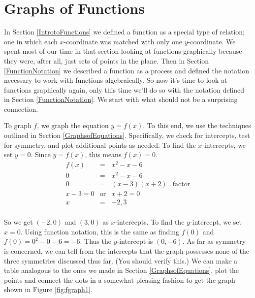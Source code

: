 \section{Graphs of Functions}
\label{GraphsofFunctions}

In Section \ref{IntrotoFunctions} we defined a function as a special type of relation; one in which each $x$-coordinate was matched with only one $y$-coordinate.  We spent most of our time in that section looking at functions graphically because they were, after all, just sets of points in the plane. Then in Section \ref{FunctionNotation} we described a function as a process and defined the notation necessary to work with functions algebraically.  So now it's time to look at functions graphically again, only this time we'll do so with the notation defined in Section \ref{FunctionNotation}.  We start with what should not be a surprising connection.

\smallskip


\medskip

{
To graph $f$, we graph the equation $y = f(x)$.  To this end, we use the techniques outlined in Section \ref{GraphsofEquations}.  Specifically, we check for intercepts, test for symmetry, and plot additional points as needed.  To find the $x$-intercepts, we set $y=0$. Since $y = f(x)$, this means $f(x) = 0$. 
\[
\begin{array}{rclr}   
f(x) & = & x^2 - x - 6 & \\ 
0 & = & x^2 - x - 6 & \\ 
0 & = & (x-3)(x+2) & \mbox{factor} \\ 
x-3 = 0 & \mbox{or} & x+2 = 0 & \\
x & = & -2, 3 & \\
\end{array} 
\]

So we get $(-2,0)$ and $(3,0)$ as $x$-intercepts.  To find the $y$-intercept, we set $x=0$.  Using function notation, this is the same as finding $f(0)$ and  $f(0) = 0^2 - 0 - 6 = -6.$  Thus the $y$-intercept is $(0,-6)$.  As far as symmetry is concerned, we can tell from the intercepts that the graph possesses none of the three symmetries discussed thus far. (You should verify this.)  We can make a table analogous to the ones we made in Section \ref{GraphsofEquations}, plot the points and connect the dots in a somewhat pleasing fashion to get the graph shown in Figure \ref{fig:fgraph1}.
}

